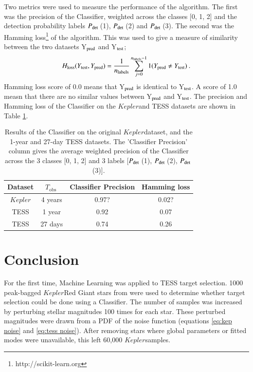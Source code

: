 \documentclass[a4paper,fleqn,usenatbib,useAMS]{mnras}
\newcommand{\kep}{\ensuremath{Kepler}\:}
\newcommand{\pdet}{\ensuremath{P_{\rm det}\:}}
\newcommand{\tobs}{\ensuremath{T_{\textrm{obs}}\:}}
\begin{document}
Two metrics were used to measure the performance of the algorithm. The first was the precision of the Classifier, weighted across the classes [0, 1, 2] and the detection probability labels \pdet(1), \pdet(2) and \pdet(3). The second was the Hamming loss\footnote{http://scikit-learn.org} of the algorithm. This was used to give a measure of similarity between the two datasets Y$_{\rm pred}$ and Y$_{\rm test}$;
\begin{equation}
H_{\rm loss}(Y_{\rm test}, Y_{\rm pred}) = \frac{1}{n_{\rm labels}} \sum_{j=0}^{n_{\rm labels}-1} 1(Y_{\rm pred} \neq Y_{\rm test}) \: . 
\end{equation}
Hamming loss score of 0.0 means that Y$_{\rm pred}$ is identical to Y$_{\rm test}$. A score of 1.0 measn that there are no similar values between Y$_{\rm pred}$ and Y$_{\rm test}$. The precision and Hamming loss of the Classifier on the \kep and TESS datasets are shown in Table \ref{tab: results}.
\begin{table}
\begin{center}
\begin{tabular}{ |c|c|c|c| }
Dataset & \tobs   & Classifier Precision & Hamming loss \\
\hline
\kep    & 4 years & 0.97?                & 0.02?        \\
TESS    & 1 year  & 0.92                 & 0.07         \\
TESS    & 27 days & 0.74                 & 0.26         \\
\end{tabular}
\end{center}
\caption{Results of the Classifier on the original \kep dataset, and the 1-year and 27-day TESS datasets. The 'Classifier Precision' column gives the average weighted precision of the Classifier across the 3 classes [0, 1, 2] and 3 labels [\pdet(1), \pdet(2), \pdet(3)].}
\label{tab: results}
\end{table}




\section{Conclusion}
\label{sect: conc}

For the first time, Machine Learning was applied to TESS target selection. 1000 peak-bagged \kep Red Giant stars from \citet{davies_asteroseismology_2016} were used to determine whether target selection could be done using a Classifier. The number of samples was increased by perturbing stellar magnitudes 100 times for each star. These perturbed magnitudes were drawn from a PDF of the noise function (equations \ref{eq:kep noise} and \ref{eq:tess noise}). After removing stars where global parameters or fitted modes were unavailable, this left 60,000 \kep samples. 
\end{document}
